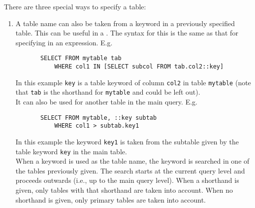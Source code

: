 \begin{description}
       There are three special ways to specify a table:
       \begin{enumerate}
       
       \item
       A table name can also be taken from a keyword in a previously
       specified table. This can be useful in a
       . The syntax for this is
       the same as that for specifying 
       in an expression. E.g.
       \begin{verbatim}
       SELECT FROM mytable tab
           WHERE col1 IN [SELECT subcol FROM tab.col2::key]
       \end{verbatim}
       In this example \texttt{key} is a table keyword of column
       \texttt{col2} in table \texttt{mytable} (note that \texttt{tab}
       is the shorthand for \texttt{mytable} and could be left out).
       \\It can also be used for another table in the main query. E.g.
       \begin{verbatim}
       SELECT FROM mytable, ::key subtab
           WHERE col1 > subtab.key1
       \end{verbatim}
       In this example the keyword \texttt{key1} is taken from the
       subtable given by the table keyword \texttt{key} in the main
       table.
       \\When a keyword is used as the table name, the keyword is
       searched
       in one of the tables previously given. The search starts at
       the current query level and proceeds outwards (i.e., up to the
       main query level). When a shorthand is given, only tables with
       that shorthand are taken into account. When no shorthand is
       given, only primary tables are taken into account.


\end{enumerate}
\end{description}
